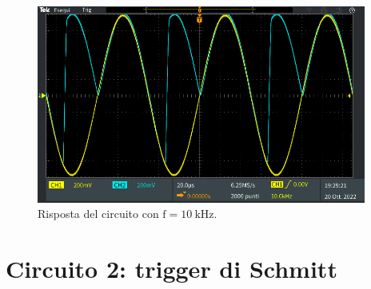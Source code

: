 \documentclass{report}
\begin{document}
\begin{figure}[h!]
	\centering
	\includegraphics[height=6.5cm]{immagini/TEK00008}
	\caption{Risposta del circuito con $\mathrm{f= \SI{10}{k\hertz}}$.}
	\label{figura:uscita12}
\end{figure}
\newpage
\null
\newpage
\section{Circuito 2: trigger di Schmitt}
\end{document}
